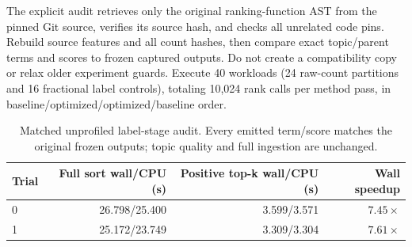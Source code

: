 \documentclass[11pt]{article}
\begin{document}
The explicit audit retrieves only the original ranking-function AST from the
pinned Git source, verifies its source hash, and checks all unrelated code pins.
Rebuild source features and all count hashes, then compare exact topic/parent
terms and scores to frozen captured outputs. Do not create a compatibility copy
or relax older experiment guards. Execute 40 workloads (24 raw-count partitions
and 16 fractional label controls), totaling 10,024 rank calls per method pass,
in baseline/optimized/optimized/baseline order.

\begin{table}[ht]
\centering\small
\begin{tabular}{lrrr}
\toprule
Trial & Full sort wall/CPU (s) & Positive top-k wall/CPU (s) & Wall speedup\\
\midrule
0 & 26.798/25.400 & 3.599/3.571 & $7.45\times$\\
1 & 25.172/23.749 & 3.309/3.304 & $7.61\times$\\
\bottomrule
\end{tabular}
\caption{Matched unprofiled label-stage audit. Every emitted term/score matches
the original frozen outputs; topic quality and full ingestion are unchanged.}
\end{table}
\end{document}
